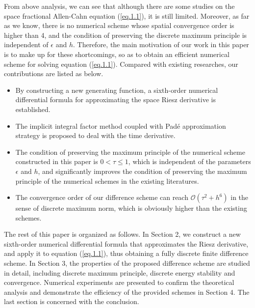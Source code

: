 \documentclass{siamart171218}
\numberwithin{theorem}{section}
\numberwithin{equation}{section}
\begin{document}
From above analysis, we can see that although
there are some studies on the space fractional Allen-Cahn equation (\ref{eq.1.1}),
it is still limited.
Moreover, as far as we know, there is no numerical scheme whose spatial
convergence order is higher than 4, and the condition of preserving
the discrete maximum principle
is independent of $\epsilon$ and $h$.
Therefore, the main motivation of our work in this paper is to
 make up for these shortcomings, so as to obtain an efficient
 numerical scheme for solving equation (\ref{eq.1.1}).
Compared with existing researches, our contributions are listed as below.
\begin{itemize}
\item By constructing a new generating function, a sixth-order numerical differential
 formula for approximating the space Riesz derivative is established.

\item The implicit integral factor method coupled with Pad\'{e} approximation strategy
is proposed to deal with the time derivative.

\item The condition of preserving the maximum principle of the numerical scheme constructed
in this paper is $0<\tau\leq1$, which is independent of the parameters
$\epsilon$ and $h$, and
 significantly improves the condition of preserving the maximum principle
  of the numerical schemes in the existing literatures.

\item The convergence order of our difference scheme can reach
$\mathcal{O}\left(\tau^2+h^6\right)$
 in the sense of discrete maximum norm, which is obviously higher
 than the existing schemes.
\end{itemize}

The rest of this paper is organized as follows. In
Section 2, we construct a new sixth-order numerical differential
 formula that approximates
the Riesz derivative, and apply it to equation (\ref{eq.1.1}),
thus obtaining a fully discrete finite
difference scheme.
In Section 3, the properties of the proposed difference
scheme are studied in detail,
 including discrete maximum principle, discrete energy
 stability and convergence.
 Numerical experiments are presented
to confirm the theoretical analysis and demonstrate the
efficiency of the provided
schemes in Section 4. The last section is concerned with the conclusion.

\end{document}
